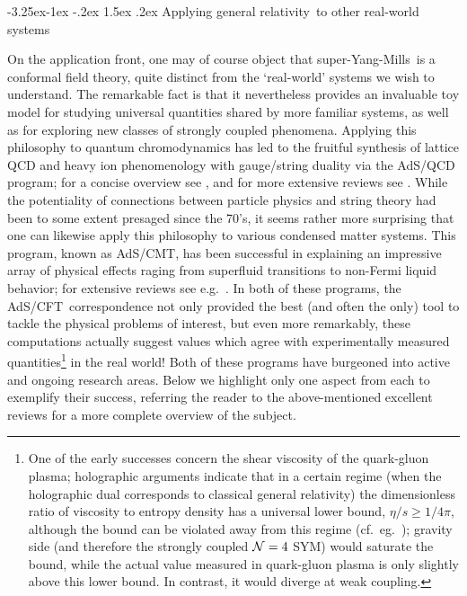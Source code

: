 \documentclass[12pt]{article}
\makeatletter
\renewcommand\subsection{\@startsection{subsection}{2}{\z@}%
                                     {-3.25ex\@plus -1ex \@minus -.2ex}%
                                     {1.5ex \@plus .2ex}%
                                     {\normalfont\bfseries}}
\def\AC{AdS/CFT}
\def\GR{general relativity}
\def\SYM{super-Yang-Mills}
\makeatother
\begin{document}
\subsection{Applying \GR\ to other real-world systems}
\label{s:flugra}


On the application front, one may of course object that \SYM\ is a conformal field theory, quite distinct from the `real-world' systems we wish to understand.  The remarkable fact is that it nevertheless provides an invaluable toy model for studying universal quantities shared by more familiar systems, as well as for exploring new classes of strongly coupled phenomena.  Applying this philosophy to quantum chromodynamics has led to the fruitful synthesis of  lattice QCD and heavy ion phenomenology with gauge/string duality via  the AdS/QCD program; 
for a concise overview see \cite{Mateos:2007ay}, and for more extensive reviews see \cite{Gubser:2009md,CasalderreySolana:2011us}.
While the potentiality of connections between particle physics and string theory had been to some extent presaged since the 70's, it seems rather more surprising that one can likewise apply this philosophy to various condensed matter systems.  This program, known as AdS/CMT, has been successful in explaining an impressive array of physical effects raging from superfluid transitions to non-Fermi liquid behavior; for extensive reviews see e.g.\ \cite{Hartnoll:2009sz,Herzog:2009xv,McGreevy:2009xe}. 
In both of these programs, the \AC\ correspondence not only provided the best (and often the only) tool to tackle the physical problems of interest, but even more remarkably, these computations actually suggest values which agree with experimentally measured quantities\footnote{
One of the early successes concern the shear viscosity of the quark-gluon plasma;  holographic arguments  \cite{Kovtun:2004de} indicate that in a certain regime (when the holographic dual corresponds to classical general relativity) the dimensionless ratio of viscosity to entropy density has a universal lower bound, $\eta/s \ge 1/4\pi$, although the bound can be violated away from this regime (cf.\ eg.\
\cite{Kats:2007mq});
gravity side (and therefore the strongly coupled ${\cal N}=4$ SYM) would saturate the bound,
while the actual value measured in quark-gluon plasma is only slightly above this lower bound. In contrast, it would diverge at weak coupling.
} in the real world! 
Both of these programs have burgeoned into active and ongoing research areas.  Below we highlight only one aspect from each to exemplify their success, referring the reader to the above-mentioned excellent reviews for a more complete overview of the subject.
\end{document}
